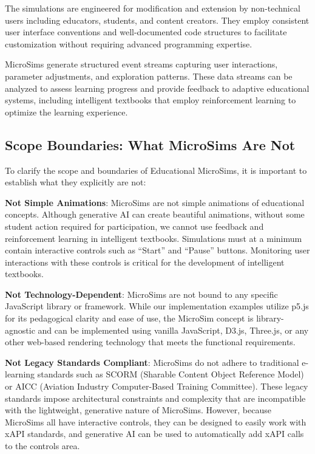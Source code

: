 The simulations are engineered for modification and extension by non-technical users including educators, students, and content creators. They employ consistent user interface conventions and well-documented code structures to facilitate customization without requiring advanced programming expertise.

MicroSims generate structured event streams capturing user interactions, parameter adjustments, and exploration patterns. These data streams can be analyzed to assess learning progress and provide feedback to adaptive educational systems, including intelligent textbooks that employ reinforcement learning to optimize the learning experience.

\subsection{Scope Boundaries: What MicroSims Are Not}

To clarify the scope and boundaries of Educational MicroSims, it is important to establish what they explicitly are not:

\textbf{Not Simple Animations}: MicroSims are not simple animations of educational concepts. Although generative AI can create beautiful animations, without some student action required for participation, we cannot use feedback and reinforcement learning in intelligent textbooks. Simulations must at a minimum contain interactive controls such as ``Start'' and ``Pause'' buttons. Monitoring user interactions with these controls is critical for the development of intelligent textbooks.

\textbf{Not Technology-Dependent}: MicroSims are not bound to any specific JavaScript library or framework. While our implementation examples utilize p5.js for its pedagogical clarity and ease of use, the MicroSim concept is library-agnostic and can be implemented using vanilla JavaScript, D3.js, Three.js, or any other web-based rendering technology that meets the functional requirements.

\textbf{Not Legacy Standards Compliant}: MicroSims do not adhere to traditional e-learning standards such as SCORM (Sharable Content Object Reference Model) or AICC (Aviation Industry Computer-Based Training Committee). These legacy standards impose architectural constraints and complexity that are incompatible with the lightweight, generative nature of MicroSims. However, because MicroSims all have interactive controls, they can be designed to easily work with xAPI standards, and generative AI can be used to automatically add xAPI calls to the controls area.

